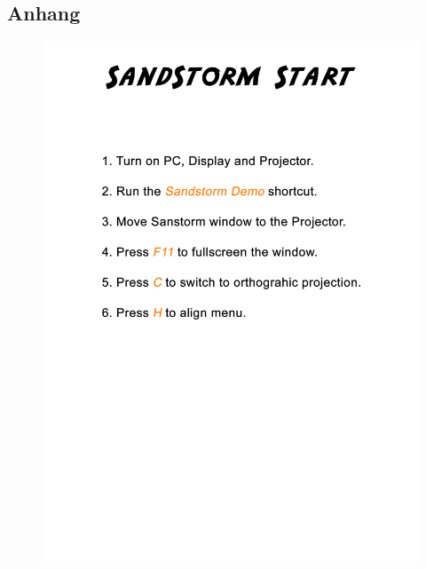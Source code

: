 \appendix
{}

\begin{Spacing}{\mylinespace}
	\renewcommand\thechapter{}
	\chapter{Anhang}
	\renewcommand{\thechapter}{A}
	
	\begin{figure}[h!]
		\centering
		\vspace*{0px}
		\includegraphics[width=\columnwidth]{graphics/Start.png}
	\end{figure}	
	

\end{Spacing}
